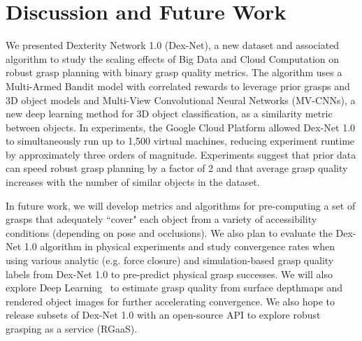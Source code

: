 \section{Discussion and Future Work}
We presented Dexterity Network 1.0 (Dex-Net), a new dataset and associated algorithm to study the scaling effects of Big Data and Cloud Computation on robust grasp planning with binary grasp quality metrics.
The algorithm uses a Multi-Armed Bandit model with correlated rewards to leverage prior grasps and 3D object models and Multi-View Convolutional Neural Networks (MV-CNNs), a new deep learning method for 3D object classification, as a similarity metric between objects. 
In experiments, the Google Cloud Platform allowed Dex-Net 1.0 to simultaneously run up to 1,500 virtual machines, reducing experiment runtime by approximately three orders of magnitude.
Experiments suggest that prior data can speed robust grasp planning by a factor of 2 and that average grasp quality increases with the number of similar objects in the dataset.

In future work, we will develop metrics and algorithms for pre-computing a set of grasps that adequately ``cover" each object from a variety of accessibility conditions (depending on pose and occlusions).
We also plan to evaluate the Dex-Net 1.0 algorithm in physical experiments and study convergence rates when using various analytic (e.g. force closure) and simulation-based grasp quality labels from Dex-Net 1.0 to pre-predict physical grasp successes.
We will also explore Deep Learning~\cite{krizhevsky2012imagenet} to estimate grasp quality from surface depthmaps and rendered object images for further accelerating convergence.
We also hope to release subsets of Dex-Net 1.0 with an open-source API to explore robust grasping as a service (RGaaS).

